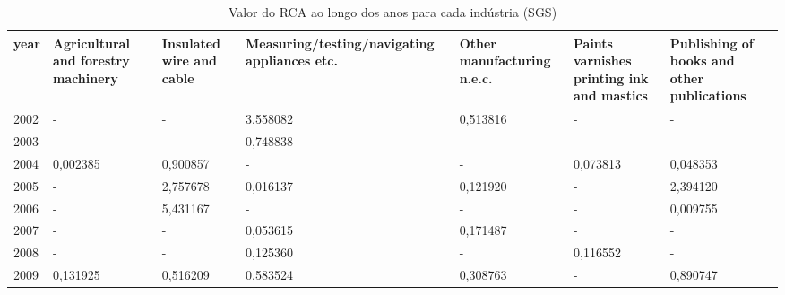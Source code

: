\begin{table}
\centering
\caption{Valor do RCA ao longo dos anos para cada indústria (SGS)}
\begin{tabular}{p{1cm}p{2cm}p{2cm}p{2cm}p{2cm}p{2cm}p{2cm}}
\toprule
 year &  Agricultural and forestry machinery &  Insulated wire and cable &  Measuring/testing/navigating appliances etc. &  Other manufacturing n.e.c. &  Paints varnishes printing ink and mastics &  Publishing of books and other publications \\
\midrule
 2002 &                                    - &                         - &                                      3,558082 &                    0,513816 &                                          - &                                           - \\
 2003 &                                    - &                         - &                                      0,748838 &                           - &                                          - &                                           - \\
 2004 &                             0,002385 &                  0,900857 &                                             - &                           - &                                   0,073813 &                                    0,048353 \\
 2005 &                                    - &                  2,757678 &                                      0,016137 &                    0,121920 &                                          - &                                    2,394120 \\
 2006 &                                    - &                  5,431167 &                                             - &                           - &                                          - &                                    0,009755 \\
 2007 &                                    - &                         - &                                      0,053615 &                    0,171487 &                                          - &                                           - \\
 2008 &                                    - &                         - &                                      0,125360 &                           - &                                   0,116552 &                                           - \\
 2009 &                             0,131925 &                  0,516209 &                                      0,583524 &                    0,308763 &                                          - &                                    0,890747 \\

\end{tabular}
\end{table}
